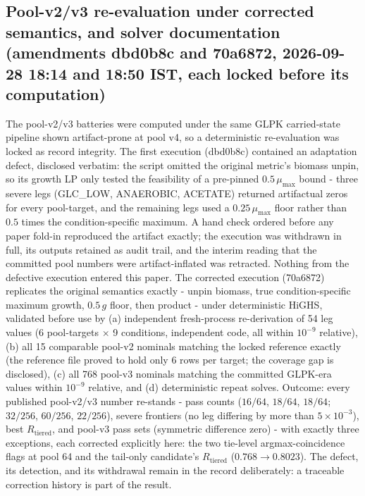 \documentclass[12pt,a4paper]{article}
\begin{document}
\subsection{Pool-v2/v3 re-evaluation under corrected semantics, and solver documentation (amendments dbd0b8c and 70a6872, 2026-09-28 18:14 and 18:50 IST, each locked before its computation)}
The pool-v2/v3 batteries were computed under the same GLPK carried-state pipeline shown artifact-prone at pool v4, so a deterministic re-evaluation was locked as record integrity. The first execution (dbd0b8c) contained an adaptation defect, disclosed verbatim: the script omitted the original metric's biomass unpin, so its growth LP only tested the feasibility of a pre-pinned $0.5\,\mu_{\max}$ bound - three severe legs (GLC\_LOW, ANAEROBIC, ACETATE) returned artifactual zeros for every pool-target, and the remaining legs used a $0.25\,\mu_{\max}$ floor rather than $0.5$ times the condition-specific maximum. A hand check ordered before any paper fold-in reproduced the artifact exactly; the execution was withdrawn in full, its outputs retained as audit trail, and the interim reading that the committed pool numbers were artifact-inflated was retracted. Nothing from the defective execution entered this paper. The corrected execution (70a6872) replicates the original semantics exactly - unpin biomass, true condition-specific maximum growth, $0.5\,g$ floor, then product - under deterministic HiGHS, validated before use by (a) independent fresh-process re-derivation of 54 leg values (6 pool-targets $\times$ 9 conditions, independent code, all within $10^{-9}$ relative), (b) all 15 comparable pool-v2 nominals matching the locked reference exactly (the reference file proved to hold only 6 rows per target; the coverage gap is disclosed), (c) all 768 pool-v3 nominals matching the committed GLPK-era values within $10^{-9}$ relative, and (d) deterministic repeat solves. Outcome: every published pool-v2/v3 number re-stands - pass counts ($16/64$, $18/64$, $18/64$; $32/256$, $60/256$, $22/256$), severe frontiers (no leg differing by more than $5\times10^{-3}$), best $R_{\mathrm{tiered}}$, and pool-v3 pass sets (symmetric difference zero) - with exactly three exceptions, each corrected explicitly here: the two tie-level argmax-coincidence flags at pool 64 and the tail-only candidate's $R_{\mathrm{tiered}}$ ($0.768 \to 0.8023$). The defect, its detection, and its withdrawal remain in the record deliberately: a traceable correction history is part of the result.
\end{document}
